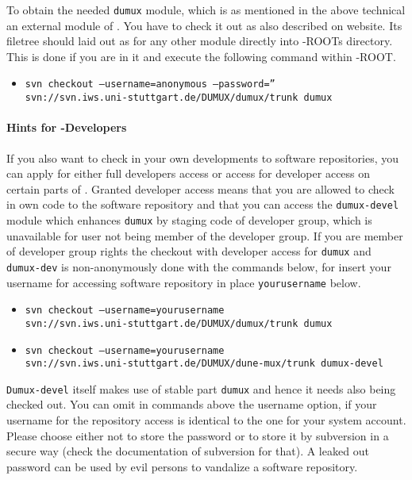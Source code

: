 
To obtain the needed \texttt{dumux} module, which is as mentioned in the above technical an external module of \Dune. You have to check it out as also described on \Dumux website. %
Its filetree should laid out as for any other \Dune module directly into \Dune-ROOTs directory. This is done if you are in it and execute the following command within \Dune-ROOT.

\begin{itemize}
\item \texttt{svn checkout --username=anonymous --password=''\\
    \hspace{4cm}  svn://svn.iws.uni-stuttgart.de/DUMUX/dumux/trunk dumux}
\end{itemize}

\paragraph{Hints for \Dumux-Developers}
If you also want to check in your own \Dumux developments to \Dumux software repositories, you can apply for either full developers access or access for developer access on certain parts of \Dumux. Granted developer access means that you are allowed to check in own code to the software repository and that you can access the \texttt{dumux-devel} module which enhances \texttt{dumux} by staging code of developer group, which is unavailable for user not being member of the developer group.
If you are member of developer group rights the checkout with developer access for \texttt{dumux} and \texttt{dumux-dev} is non-anonymously done with the commands below, for insert your username
for accessing \Dumux software repository in place \texttt{yourusername} below.
\begin{itemize}
 \item \texttt{svn checkout --username=yourusername \\ 
      \hspace{4cm} svn://svn.iws.uni-stuttgart.de/DUMUX/dumux/trunk dumux}
 \item \texttt{svn checkout --username=yourusername \\
      \hspace{4cm} svn://svn.iws.uni-stuttgart.de/DUMUX/dune-mux/trunk dumux-devel}
\end{itemize} 
\texttt{Dumux-devel} itself makes use of stable part \texttt{dumux} and hence it needs also being checked out. 
You can omit in commands above the username option, if your username for the repository access is identical to the one for your system account.
Please choose either not to store the password or to store it by subversion in a secure way (check the documentation of subversion for that). 
A leaked out password can be used by evil persons to vandalize a software repository.


